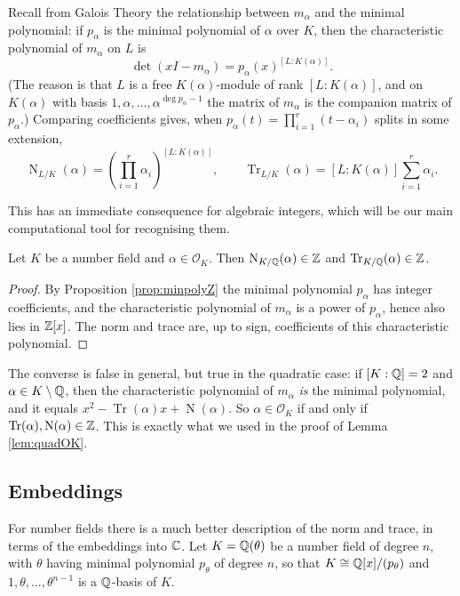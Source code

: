\documentclass[a4paper]{scrartcl}
\renewcommand{\OO}{\mathcal{O}}
\newcommand{\Nm}{\operatorname{N}}
\newcommand{\Tr}{\operatorname{Tr}}
\begin{document}
Recall from Galois Theory the relationship between $m_\alpha$ and the minimal polynomial: if $p_\alpha$ is the minimal polynomial of $\alpha$ over $K$, then the characteristic polynomial of $m_\alpha$ on $L$ is
$$\det(x I - m_\alpha) = p_\alpha(x)^{[L : K(\alpha)]}.$$
(The reason is that $L$ is a free $K(\alpha)$-module of rank $[L:K(\alpha)]$, and on $K(\alpha)$ with basis $1, \alpha, \dots, \alpha^{\deg p_\alpha - 1}$ the matrix of $m_\alpha$ is the companion matrix of $p_\alpha$.) Comparing coefficients gives, when $p_\alpha(t) = \prod_{i=1}^r (t - \alpha_i)$ splits in some extension,
$$\Nm_{L/K}(\alpha) = \left(\prod_{i=1}^r \alpha_i\right)^{[L:K(\alpha)]}, \qquad \Tr_{L/K}(\alpha) = [L:K(\alpha)]\sum_{i=1}^r \alpha_i.$$

This has an immediate consequence for algebraic integers, which will be our main computational tool for recognising them.

\begin{lemma}\label{lem:normtraceZ}
	Let $K$ be a number field and $\alpha \in \OO_K$. Then $\Nm_{K/\Q}(\alpha) \in \Z$ and $\Tr_{K/\Q}(\alpha) \in \Z$.
\end{lemma}

\begin{proof}
	By Proposition \ref{prop:minpolyZ} the minimal polynomial $p_\alpha$ has integer coefficients, and the characteristic polynomial of $m_\alpha$ is a power of $p_\alpha$, hence also lies in $\mathbb{Z}[x]$. The norm and trace are, up to sign, coefficients of this characteristic polynomial.
\end{proof}

\begin{remark}
	The converse is false in general, but true in the quadratic case: if $[K:\mathbb{Q}] = 2$ and $\alpha \in K \setminus \mathbb{Q}$, then the characteristic polynomial of $m_\alpha$ \emph{is} the minimal polynomial, and it equals $x^2 - \Tr(\alpha)x + \Nm(\alpha)$. So $\alpha \in \OO_K$ if and only if $\Tr(\alpha), \Nm(\alpha) \in \Z$. This is exactly what we used in the proof of Lemma \ref{lem:quadOK}.
\end{remark}

\subsection{Embeddings}

For number fields there is a much better description of the norm and trace, in terms of the embeddings into $\mathbb{C}$. Let $K = \mathbb{Q}(\theta)$ be a number field of degree $n$, with $\theta$ having minimal polynomial $p_\theta$ of degree $n$, so that $K \cong \mathbb{Q}[x]/(p_\theta)$ and $1, \theta, \dots, \theta^{n-1}$ is a $\mathbb{Q}$-basis of $K$.
\end{document}
